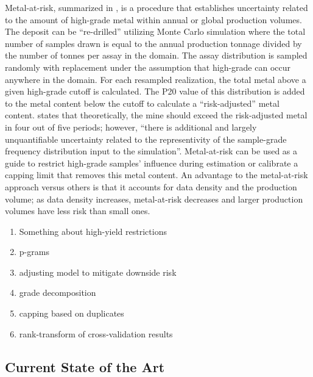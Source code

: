 Metal-at-risk, summarized in \cite{parker2006}, is a procedure that establishes uncertainty related to the amount of high-grade metal within annual or global production volumes. The deposit can be ``re-drilled'' utilizing Monte Carlo simulation where the total number of samples drawn is equal to the annual production tonnage divided by the number of tonnes per assay in the domain. The assay distribution is sampled randomly with replacement under the assumption that high-grade can occur anywhere in the domain. For each resampled realization, the total metal above a given high-grade cutoff is calculated. The P20 value of this distribution is added to the metal content below the cutoff to calculate a ``risk-adjusted'' metal content. \cite{parker2006} states that theoretically, the mine should exceed the risk-adjusted metal in four out of five periods; however, ``there is additional and largely unquantifiable uncertainty related to the representivity of the sample-grade frequency distribution input to the simulation''. Metal-at-risk can be used as a guide to restrict high-grade samples' influence during estimation or calibrate a capping limit that removes this metal content. An advantage to the metal-at-risk approach versus others is that it accounts for data density and the production volume; as data density increases, metal-at-risk decreases and larger production volumes have less risk than small ones.

\begin{enumerate}
    \item Something about high-yield restrictions
    \item p-grams \cite{nowak2019optimal}
    \item adjusting model to mitigate downside risk
    \item grade decomposition \cite{rivoirard2013topcut}
    \item capping based on duplicates \cite{dutaut2021new}
    \item rank-transform of cross-validation results \cite{babakhani2014geostatistical}
\end{enumerate}


\FloatBarrier
\subsection{Current State of the Art}
\label{subsec:02state}



